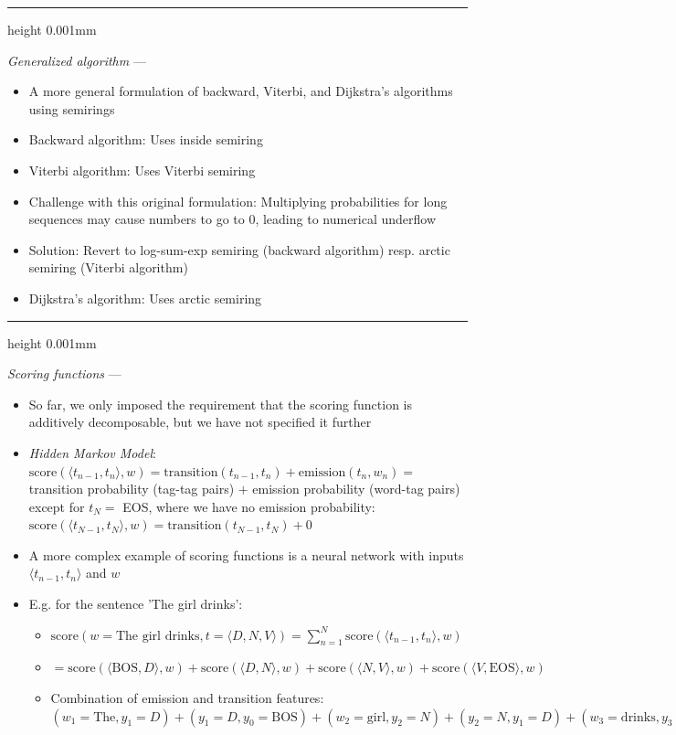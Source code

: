 {\color{lightgray}\hrule height 0.001mm}

\emph{Generalized algorithm} --- 
\begin{itemize}
    \item A more general formulation of backward, Viterbi, and Dijkstra's algorithms using semirings
    \item Backward algorithm: Uses inside semiring
    \item Viterbi algorithm: Uses Viterbi semiring
    \item Challenge with this original formulation: Multiplying probabilities for long sequences may cause numbers to go to $0$, leading to numerical underflow
    \item Solution: Revert to log-sum-exp semiring (backward algorithm) resp. arctic semiring (Viterbi algorithm)
    \item Dijkstra's algorithm: Uses arctic semiring
\end{itemize}

{\color{lightgray}\hrule height 0.001mm}

\emph{Scoring functions} --- 
\begin{itemize}
    \item So far, we only imposed the requirement that the scoring function is additively decomposable, but we have not specified it further
    \item \emph{Hidden Markov Model}:
    $
    \textrm{score}(\langle t_{n-1}, t_n \rangle,w) = \textrm{transition}(t_{n-1}, t_n) + \textrm{emission}(t_n, w_n) =
    $ transition probability (tag-tag pairs) $+$ emission probability (word-tag pairs) except for $t_N =$ EOS, where we have no emission probability: $
    \textrm{score}(\langle t_{N-1}, t_N \rangle,w) = \textrm{transition}(t_{N-1}, t_N) + 0
    $
    \item A more complex example of scoring functions is a neural network with inputs $\langle t_{n-1}, t_n \rangle$ and $w$
    \item E.g. for the sentence 'The girl drinks':
    \begin{itemize}
        \item $\textrm{score}(w = \textrm{The girl drinks}, t = \langle D, N, V \rangle) = \sum_{n=1}^{N} \textrm{score}(\langle t_{n-1}, t_n \rangle, w)$
        \item $= \textrm{score}(\langle \textrm{BOS}, D \rangle, w) + \textrm{score}(\langle D, N \rangle, w) + \textrm{score}(\langle N, V \rangle, w) + \textrm{score}(\langle V, \textrm{EOS} \rangle, w)$
        \item Combination of emission and transition features: $(w_1 = \textrm{The}, y_1 = D) + (y_1 = D, y_0 = \textrm{BOS}) + (w_2 = \textrm{girl}, y_2 = N) + (y_2 = N, y_1 = D) + (w_3 = \textrm{drinks}, y_3 = V) + (y_3 = V, y_2 = N) + (y_4 = \textrm{EOS}, y_3 = V)$
    \end{itemize}
\end{itemize}

